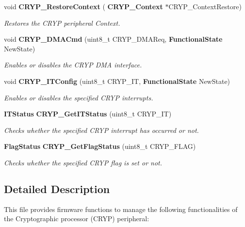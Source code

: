 \begin{DoxyCompactItemize}
void \textbf{ C\+R\+Y\+P\+\_\+\+Restore\+Context} (\textbf{ C\+R\+Y\+P\+\_\+\+Context} $\ast$C\+R\+Y\+P\+\_\+\+Context\+Restore)
\begin{DoxyCompactList}\small\item\em Restores the C\+R\+YP peripheral Context. \end{DoxyCompactList}\item 
void \textbf{ C\+R\+Y\+P\+\_\+\+D\+M\+A\+Cmd} (uint8\+\_\+t C\+R\+Y\+P\+\_\+\+D\+M\+A\+Req, \textbf{ Functional\+State} New\+State)
\begin{DoxyCompactList}\small\item\em Enables or disables the C\+R\+YP D\+MA interface. \end{DoxyCompactList}\item 
void \textbf{ C\+R\+Y\+P\+\_\+\+I\+T\+Config} (uint8\+\_\+t C\+R\+Y\+P\+\_\+\+IT, \textbf{ Functional\+State} New\+State)
\begin{DoxyCompactList}\small\item\em Enables or disables the specified C\+R\+YP interrupts. \end{DoxyCompactList}\item 
\textbf{ I\+T\+Status} \textbf{ C\+R\+Y\+P\+\_\+\+Get\+I\+T\+Status} (uint8\+\_\+t C\+R\+Y\+P\+\_\+\+IT)
\begin{DoxyCompactList}\small\item\em Checks whether the specified C\+R\+YP interrupt has occurred or not. \end{DoxyCompactList}\item 
\textbf{ Flag\+Status} \textbf{ C\+R\+Y\+P\+\_\+\+Get\+Flag\+Status} (uint8\+\_\+t C\+R\+Y\+P\+\_\+\+F\+L\+AG)
\begin{DoxyCompactList}\small\item\em Checks whether the specified C\+R\+YP flag is set or not. \end{DoxyCompactList}\end{DoxyCompactItemize}


\subsection{Detailed Description}
This file provides firmware functions to manage the following functionalities of the Cryptographic processor (C\+R\+YP) peripheral\+: 

